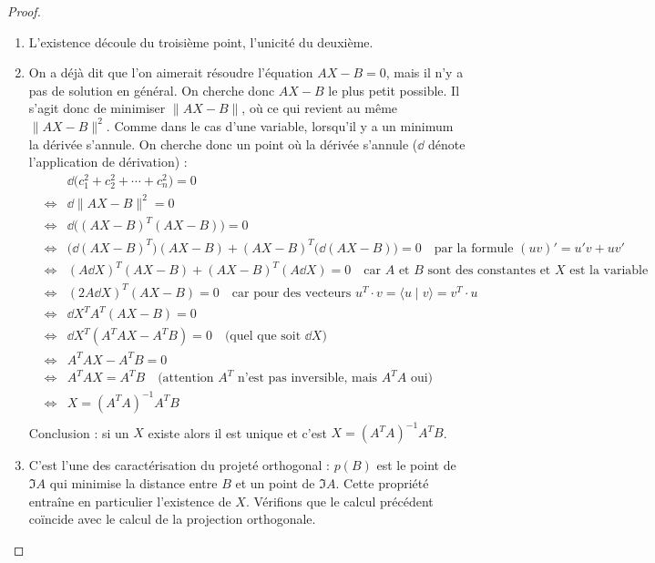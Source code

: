 \documentclass[class=report,crop=false]{standalone}
\begin{document}
\begin{proof}~
\begin{enumerate}
  \item L'existence découle du troisième point, 
  l'unicité du deuxième.
  
  \item On a déjà dit que l'on aimerait résoudre l'équation $AX-B=0$, 
  mais il n'y a pas de solution en général. On cherche donc $AX-B$ le plus petit possible.
  Il s'agit donc de minimiser $\|AX-B\|$, où ce qui revient au même $\|AX-B\|^2$.
  Comme dans le cas d'une variable, lorsqu'il y a un minimum  la dérivée s'annule. 
  On cherche donc un point où la dérivée s'annule 
  ($\dd$ dénote l'application de dérivation) :
  \begin{eqnarray*}
    && \dd  \big(  c_1^2 + c_2^2+\cdots+c_n^2 \big) = 0 \\
    & \iff & \dd \|AX-B\|^2 = 0 \\
    & \iff & \dd \big((AX-B)^T(AX-B)\big) = 0 \\  
    & \iff & \big(\dd (AX-B)^T\big)(AX-B) + (AX-B)^T\big(\dd (AX-B)\big)  = 0
    \quad \text{par la formule } (uv)'=u'v+uv' \\
    & \iff & (A\dd X)^T(AX-B) + (AX-B)^T (A\dd X)  = 0
    \quad \text{car $A$ et $B$ sont des constantes et $X$ est la variable}  \\  
    & \iff & (2A\dd X)^T(AX-B) = 0 
    \quad \text{car pour des vecteurs } u^T \cdot v = \langle u \mid v \rangle = v^T \cdot u \\
    & \iff & \dd X^T A^T(AX-B) = 0 \\
    & \iff & \dd X^T (A^TAX-A^TB) = 0  
    \quad \text{(quel que soit $\dd X$)}\\
    & \iff & A^TAX-A^TB = 0 \\
    & \iff & A^TAX = A^TB \quad \text{(attention $A^T$ n'est pas inversible, mais $A^TA$ oui)}\\
    & \iff & X = (A^TA)^{-1} A^TB \\
  \end{eqnarray*}
  Conclusion : si un $X$ existe alors il est unique et c'est  $X = (A^TA)^{-1} A^TB$.
  
  \item C'est l'une des caractérisation du projeté orthogonal : $p(B)$ est le point de $\Im A$
  qui minimise la distance entre $B$ et un point de $\Im A$. Cette propriété entraîne en particulier 
  l'existence de $X$. Vérifions que le calcul précédent coïncide avec le calcul de la projection orthogonale.
  

\end{enumerate}
\end{proof}
\end{document}
